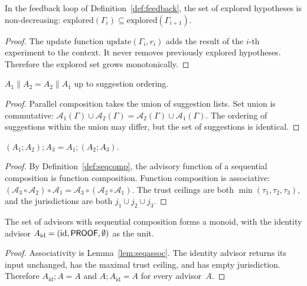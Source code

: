 \documentclass[11pt]{article}
\begin{document}
\begin{lemma}%
\label{lem:fbmono}
In the feedback loop of Definition~\ref{def:feedback},
the set of explored hypotheses is non-decreasing:
$\mathrm{explored}(\Gamma_i) \subseteq \mathrm{explored}(\Gamma_{i+1})$.
\end{lemma}
\begin{proof}
The update function $\mathrm{update}(\Gamma_i, r_i)$
adds the result of the $i$-th experiment to the context.
It never removes previously explored hypotheses.
Therefore the explored set grows monotonically.
\end{proof}

\begin{lemma}%
\label{lem:parcomm}
$A_1 \| A_2 = A_2 \| A_1$ up to suggestion ordering.
\end{lemma}
\begin{proof}
Parallel composition takes the union of suggestion lists.
Set union is commutative: $\mathcal{A}_1(\Gamma) \cup
\mathcal{A}_2(\Gamma) = \mathcal{A}_2(\Gamma) \cup
\mathcal{A}_1(\Gamma)$.  The ordering of suggestions
within the union may differ, but the set of suggestions
is identical.
\end{proof}

\begin{lemma}%
\label{lem:seqassoc}
$(A_1 \mathbin{;} A_2) \mathbin{;} A_3 = A_1 \mathbin{;} (A_2 \mathbin{;} A_3)$.
\end{lemma}
\begin{proof}
By Definition~\ref{def:seqcomp}, the advisory function
of a sequential composition is function composition.
Function composition is associative:
$(\mathcal{A}_3 \circ \mathcal{A}_2) \circ \mathcal{A}_1
= \mathcal{A}_3 \circ (\mathcal{A}_2 \circ \mathcal{A}_1)$.
The trust ceilings are both $\min(\tau_1, \tau_2, \tau_3)$,
and the jurisdictions are both $j_1 \cup j_2 \cup j_3$.
\end{proof}

\begin{corollary}\label{cor:advmonoid}
The set of advisors with sequential composition forms
a monoid, with the identity advisor $A_\mathrm{id} =
(\mathrm{id}, \mathsf{PROOF}, \emptyset)$ as the unit.
\end{corollary}
\begin{proof}
Associativity is Lemma~\ref{lem:seqassoc}.  The identity
advisor returns its input unchanged, has the maximal
trust ceiling, and has empty jurisdiction.  Therefore
$A_\mathrm{id} \mathbin{;} A = A$ and
$A \mathbin{;} A_\mathrm{id} = A$ for every advisor~$A$.
\end{proof}
\end{document}
